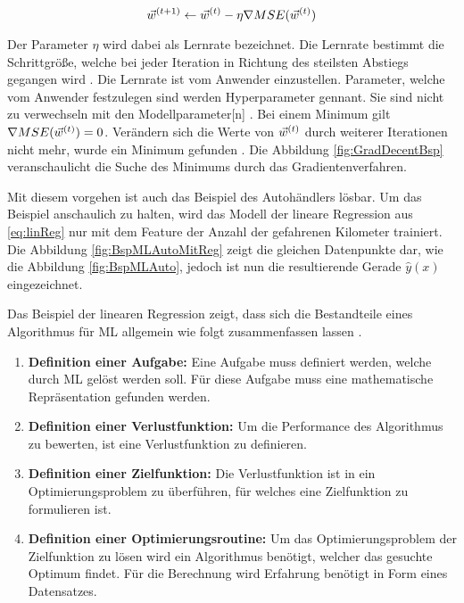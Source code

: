 \begin{equation}
    \label{eq:GradDecentUpdateW}
    \vec{w}^{(t+1)} \leftarrow \vec{w}^{(t)} - \eta\nabla MSE(\vec{w}^{(t)})
\end{equation}

Der Parameter \(\eta\) wird dabei als Lernrate bezeichnet. Die Lernrate bestimmt die Schrittgröße, welche bei jeder Iteration in Richtung des steilsten Abstiegs gegangen wird \cite{Mitchell.1997}. Die Lernrate ist vom Anwender einzustellen. Parameter, welche vom Anwender festzulegen sind werden \gls{Hyperparameter} gennant. Sie sind nicht zu verwechseln mit den \gls{Modellparameter}[n] \cite{Zheng.2015}. Bei einem Minimum gilt \(\nabla MSE(\vec{w}^{(t)}) = 0\). Verändern sich die Werte von \(\vec{w}^{(t)}\) durch weiterer Iterationen nicht mehr, wurde ein Minimum gefunden \cite{Goodfellow.2016, Burkov.2019}. Die Abbildung \ref{fig:GradDecentBsp} veranschaulicht die Suche des Minimums durch das \gls{Gradientenverfahren}.


Mit diesem vorgehen ist auch das Beispiel des Autohändlers lösbar. Um das Beispiel anschaulich zu halten, wird das Modell der lineare Regression aus \ref{eq:linReg} nur mit dem \gls{Feature} der Anzahl der gefahrenen Kilometer trainiert. Die Abbildung \ref{fig:BspMLAutoMitReg} zeigt die gleichen Datenpunkte dar, wie die Abbildung \ref{fig:BspMLAuto}, jedoch ist nun die resultierende Gerade \(\hat{y}(x)\) eingezeichnet. 


Das Beispiel der linearen Regression zeigt, dass sich die Bestandteile eines Algorithmus für \gls{ML} allgemein wie folgt zusammenfassen lassen \cite{Burkov.2019, Mitchell.1997, Goodfellow.2016}.

\begin{enumerate}
    \item \textbf{Definition einer Aufgabe:} Eine Aufgabe muss definiert werden, welche durch \gls{ML} gelöst werden soll. Für diese Aufgabe muss eine mathematische Repräsentation gefunden werden.
    \item \textbf{Definition einer \gls{Verlustfunktion}:} Um die Performance des Algorithmus zu bewerten, ist eine \gls{Verlustfunktion} zu definieren.
    \item \textbf{Definition einer \gls{Zielfunktion}:} Die \gls{Verlustfunktion} ist in ein Optimierungsproblem zu überführen, für welches eine \gls{Zielfunktion} zu formulieren ist.
    \item \textbf{Definition einer Optimierungsroutine:} Um das Optimierungsproblem der \gls{Zielfunktion} zu lösen wird ein Algorithmus benötigt, welcher das gesuchte Optimum findet. Für die Berechnung wird Erfahrung benötigt in Form eines Datensatzes.
\end{enumerate}


